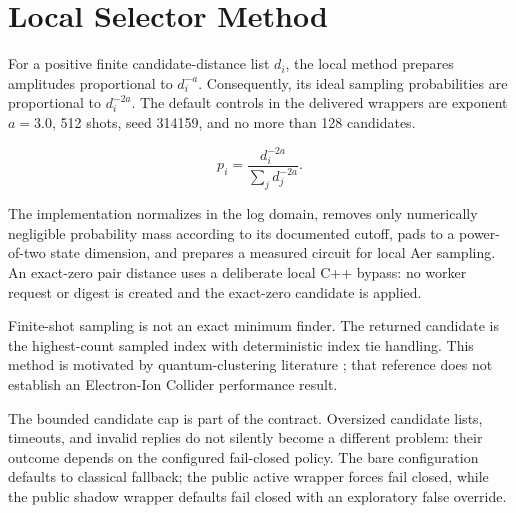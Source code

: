 \section{Local Selector Method}
For a positive finite candidate-distance list \(d_i\), the local method prepares amplitudes proportional to \(d_i^{-a}\). Consequently, its ideal sampling probabilities are proportional to \(d_i^{-2a}\). The default controls in the delivered wrappers are exponent \(a=3.0\), 512 shots, seed 314159, and no more than 128 candidates.

\[
  p_i = \frac{d_i^{-2a}}{\sum_j d_j^{-2a}}.
\]

The implementation normalizes in the log domain, removes only numerically negligible probability mass according to its documented cutoff, pads to a power-of-two state dimension, and prepares a measured circuit for local Aer sampling. An exact-zero pair distance uses a deliberate local C++ bypass: no worker request or digest is created and the exact-zero candidate is applied.

\partialevidence Finite-shot sampling is not an exact minimum finder. The returned candidate is the highest-count sampled index with deterministic index tie handling. This method is motivated by quantum-clustering literature \cite{Martinez2022}; that reference does not establish an Electron-Ion Collider performance result.

The bounded candidate cap is part of the contract. Oversized candidate lists, timeouts, and invalid replies do not silently become a different problem: their outcome depends on the configured fail-closed policy. The bare configuration defaults to classical fallback; the public active wrapper forces fail closed, while the public shadow wrapper defaults fail closed with an exploratory false override.
\clearpage

